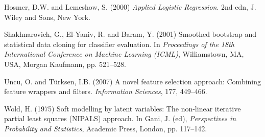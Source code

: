 \documentclass[a4paper,11pt]{article}
\begin{document}

\begin{thebibliography}{}

Hosmer, D.W. and Lemeshow, S. (2000) \textit{Applied Logistic Regression}. 2nd edn, J. Wiley and Sons, New York.

Shakhnarovich, G., El-Yaniv, R. and Baram, Y. (2001) Smoothed bootstrap and statistical data cloning for classifier
evaluation. In \textit{Proceedings of the 18th International Conference on Machine Learning (ICML)}, Williamstown, MA, USA, Morgan Kaufmann, pp.
521--528.

Uncu, O. and T\"urksen, I.B. (2007) A novel feature selection
approach: Combining feature wrappers and filters. \textit{Information Sciences}, 177, 449--466.

 Wold, H. (1975) Soft modelling by latent variables: The non-linear iterative partial least squares ({NIPALS})
approach. In Gani, J. (ed), \textit{Perspectives in Probability and Statistics}, Academic Press, London, pp. 117--142.


\end{thebibliography}
\end{document}

